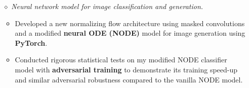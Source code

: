 \documentclass{simplecv}
\begin{document}
\begin{itemize}
  \item[$\diamond$] {\it Neural network model for image classification and generation.} %
  \begin{itemize}
    \item Developed a new normalizing flow architecture using masked convolutions and a modified {\bf neural ODE (NODE)} model for image generation using {\bf PyTorch}.%
    \vspace{0.1em}
    \item Conducted rigorous statistical tests on my modified NODE classifier model with {\bf adversarial training} to demonstrate its training speed-up and similar adversarial robustness compared to the vanilla NODE model.
  \end{itemize}

\end{itemize}
\end{document}
